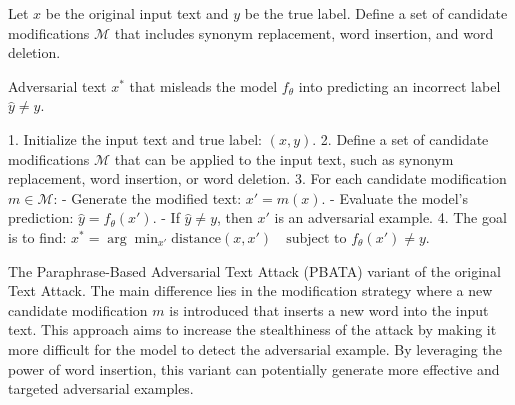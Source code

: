 Let \( x \) be the original input text and \( y \) be the true label. Define a set of candidate modifications \( \mathcal{M} \) that includes synonym replacement, word insertion, and word deletion.

Adversarial text \( x^* \) that misleads the model \( f_{\theta} \) into predicting an incorrect label \( \hat{y} \neq y \).


1. Initialize the input text and true label:
   $
   (x, y).
   $
2. Define a set of candidate modifications \( \mathcal{M} \) that can be applied to the input text, such as synonym replacement, word insertion, or word deletion.
3. For each candidate modification \( m \in \mathcal{M} \):
   - Generate the modified text:
   $
   x' = m(x).
   $
   - Evaluate the model's prediction:
   $
   \hat{y} = f_{\theta}(x').
   $
   - If \( \hat{y} \neq y \), then \( x' \) is an adversarial example.
4. The goal is to find:
   $
   x^* = \arg\min_{x'} \text{distance}(x, x') \quad \text{subject to } f_{\theta}(x') \neq y.
   $

The Paraphrase-Based Adversarial Text Attack (PBATA) variant of the original Text Attack. The main difference lies in the modification strategy where a new candidate modification \( m \) is introduced that inserts a new word into the input text. This approach aims to increase the stealthiness of the attack by making it more difficult for the model to detect the adversarial example. By leveraging the power of word insertion, this variant can potentially generate more effective and targeted adversarial examples.